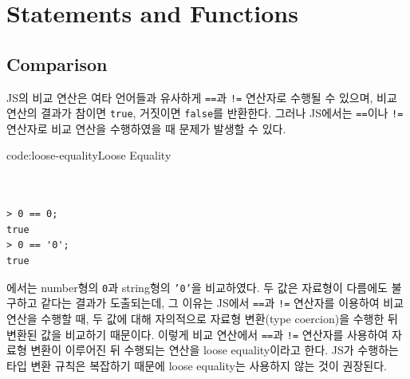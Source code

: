 \section{Statements and Functions} \label{sect:statements-and-functions}

\subsection*{Comparison}

JS의 비교 연산은 여타 언어들과 유사하게 \texttt{==}과 \texttt{!=} 연산자로 수행될 수 있으며, 비교 연산의 결과가 참이면 \texttt{true}, 거짓이면 \texttt{false}를 반환한다. 그러나 JS에서는 \texttt{==}이나 \texttt{!=} 연산자로 비교 연산을 수행하였을 때 문제가 발생할 수 있다.

\begin{codeenv}{code:loose-equality}{Loose Equality}\begin{verbatim}


> 0 == 0;
true
> 0 == '0';
true
\end{verbatim}
\end{codeenv}

에서는 number형의 \texttt{0}과 string형의 \texttt{'0'}을 비교하였다. 두 값은 자료형이 다름에도 불구하고 같다는 결과가 도출되는데, 그 이유는 JS에서 \texttt{==}과 \texttt{!=} 연산자를 이용하여 비교 연산을 수행할 때, 두 값에 대해 자의적으로 자료형 변환(type coercion)을 수행한 뒤 변환된 값을 비교하기 때문이다. 이렇게 비교 연산에서 \texttt{==}과 \texttt{!=} 연산자를 사용하여 자료형 변환이 이루어진 뒤 수행되는 연산을 loose equality이라고 한다. JS가 수행하는 타입 변환 규칙은 복잡하기 때문에 loose equality는 사용하지 않는 것이 권장된다.

